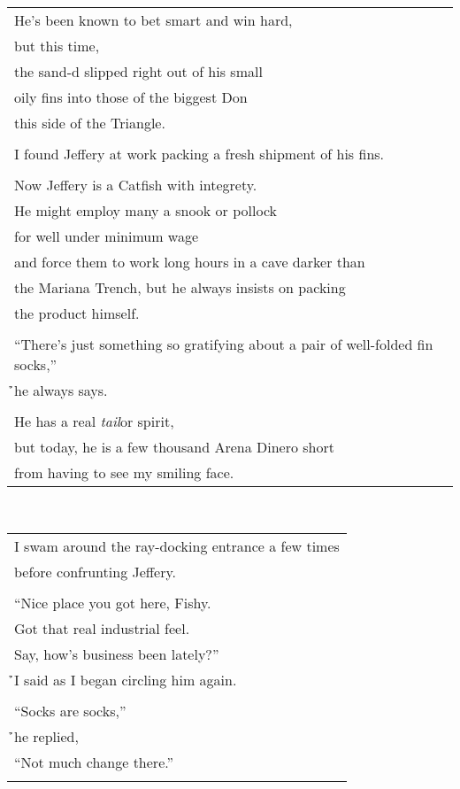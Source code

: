 \documentclass{article}
\begin{document}
\begin{center}
\begin{tabular}{l}
He's been known to bet smart and win hard, \\
but this time, \\
the sand-d slipped right out of his small \\
oily fins into those of the biggest Don \\ %
this side of the Triangle. \\
\\
I found Jeffery at work packing a fresh shipment of his fins. \\
\\
Now Jeffery is a Catfish with integrety. \\
He might employ many a snook or pollock \\
for well under minimum wage \\
and force them to work long hours in a cave darker than \\
the Mariana Trench, but he always insists on packing \\
the product himself. \\
\\
``There's just something so gratifying about a pair of well-folded fin socks,'' \\
\h\h{}he always says. \\
\\
He has a real \textit{tail}or spirit, \\
but today, he is a few thousand Arena Dinero short \\ %
from having to see my smiling face. \\
\end{tabular} \\
\begin{tabular}{l}
I swam around the ray-docking entrance a few times \\
before confrunting Jeffery. \\
\\
``Nice place you got here, Fishy. \\
Got that real industrial feel. \\
Say, how's business been lately?'' \\
\h\h{}I said as I began circling him again. \\
\\
``Socks are socks,'' \\
\h\h{}he replied, \\
``Not much change there.'' \\
\\

\end{tabular}
\end{center}
\end{document}
